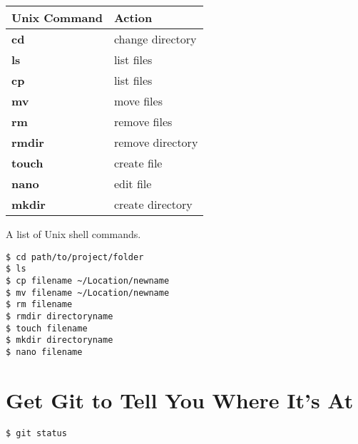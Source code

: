 \documentclass{tufte-handout}
\begin{document}
\begin{margintable}[130pt]
  \footnotesize%
  \begin{center}
    \begin{tabular}{ll}
      \toprule
     Unix Command & Action \\
      \midrule
     \bf{cd}  & change directory        \\
    \bf{ls}  & list files        \\
     \bf{cp}  & list files        \\
      \bf{mv}  & move files        \\
       \bf{rm}  & remove files        \\
        \bf{rmdir}  & remove directory        \\
         \bf{touch}  & create file        \\
          \bf{nano}  & edit file        \\
           \bf{mkdir}  & create directory        \\
      \bottomrule
    \end{tabular}
  \end{center}
  \caption{A list of Unix shell commands.}
  \label{tab:font-sizes}
\end{margintable}


\begin{shaded}
\begin{verbatim}
$ cd path/to/project/folder
$ ls
$ cp filename ~/Location/newname
$ mv filename ~/Location/newname
$ rm filename
$ rmdir directoryname
$ touch filename
$ mkdir directoryname
$ nano filename
\end{verbatim}
\end{shaded}


\section{Get Git to Tell You Where It's At}

\begin{shaded}
\begin{verbatim}
$ git status
\end{verbatim}
\end{shaded}

\vspace{1cm}
\end{document}
